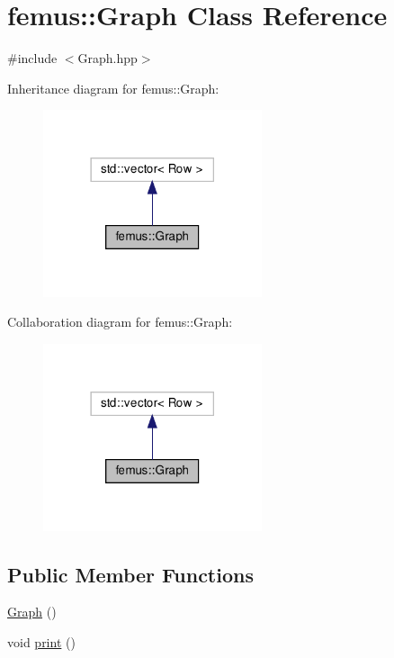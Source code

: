 \hypertarget{classfemus_1_1_graph}{}\section{femus\+:\+:Graph Class Reference}
\label{classfemus_1_1_graph}


{\ttfamily \#include $<$Graph.\+hpp$>$}



Inheritance diagram for femus\+:\+:Graph\+:
\nopagebreak
\begin{figure}[H]
\begin{center}
\leavevmode
\includegraphics[width=182pt]{classfemus_1_1_graph__inherit__graph}
\end{center}
\end{figure}


Collaboration diagram for femus\+:\+:Graph\+:
\nopagebreak
\begin{figure}[H]
\begin{center}
\leavevmode
\includegraphics[width=182pt]{classfemus_1_1_graph__coll__graph}
\end{center}
\end{figure}
\subsection*{Public Member Functions}
\begin{DoxyCompactItemize}
\item 
\mbox{\hyperlink{classfemus_1_1_graph_abdb1ed856833315bedbba9a7c78b6775}{Graph}} ()
\item 
void \mbox{\hyperlink{classfemus_1_1_graph_a0bbb268b31a320d41355a3a43065e36c}{print}} ()
\end{DoxyCompactItemize}
